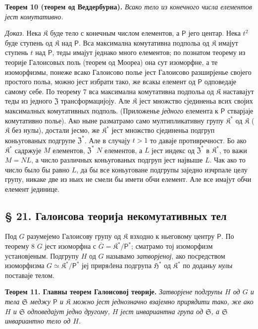 \documentclass[11pt]{article}
\begin{document}
\textbf{Теорем 10 (теорем од Веддербурна).} \emph{Всако тело из конечного числа елементов јест комутативно.}

\emph{Доказ.} Нека \(\mathfrak K\) буде тело с конечным числом елементов, а \(\mathsf P\) јего центар. Нека \(t^2\) буде ступень од \(\mathfrak K\) над \(\mathsf P\). Вса максимална комутативна подпольа од \(\mathfrak K\) имајут ступень \(t\) над \(\mathsf P\), теды имајут једнако много елементов; по познатом теорему из теорије Галоисовых поль (теорем од Моореа) она сут изоморфне, а те изоморфизмы, понеже всако Галоисово полье јест Галоисово разширјенье својего простого польа, можно јест избрати тако, же всакы елемент од \(\mathsf P\) одповедаје самому себе. По теорему 7 вса максимална комутативна подпольа од \(\mathfrak K\) наставајут теды из једного \(\mathfrak Z\) трансформацијоју. Але \(\mathfrak K\) јест множство сјединеньа всих својих максималных комутативных подполь. (Приложенье \emph{једного} елемента к \(\mathsf P\) стварјаје комутативно полье). Ако ныне разматрамо само мултипликативну групу \(\mathfrak K^*\) од \(\mathfrak K\) (\(\mathfrak K\) без нулы), достали јесмо, же \(\mathfrak K^*\) јест множство сјединеньа подгруп коньугованых подгрупе \(\mathfrak Z^*\). Але в случају \(t>1\) то даваје противречност. Бо ако \(\mathfrak K^*\) садржује \(M\) елементов, \(\mathfrak Z^*\) \(N\) елементов, а \(L\) јест индекс од \(\mathfrak Z^*\) в \(\mathfrak K^*\), то важи \(M=NL\), а число различных коньугованых подгруп јест највыше \(L\). Чак ако то число было бы равно \(L\), да бы все коньуговане подгрупы заједно изчрпале целу групу, никаке две из ньих не смели бы имети обчи елемент. Але все имајут обчи елемент јединице.

\subsection*{§ 21. Галоисова теорија некомутативных тел}\label{die-galoissche-theorie-der-nichtkommutativen-koerper}

Под \(G\) разумејемо Галоисову групу од \(\mathfrak K\) взходно к ньеговому центру \(\mathsf P\). По теорему 8 \(G\) јест изоморфна с \(\overline G=\mathfrak K^*/\mathsf P^*\); сматрамо тој изоморфизм установјеным. Подгрупу \(H\) од \(G\) называмо \emph{затворјеној}, ако посредством изоморфизма \(G\simeq\mathfrak K^*/\mathsf P^*\) јеј приряđена подгрупа \(\mathfrak H^*\) од \(\mathfrak K^*\) по доданьу \emph{нулы} поставаје телом.


\textbf{Теорем 11. Главны теорем Галоисовој теорије.} \emph{Затворјене подгрупы \(H\) од \(G\) и тела \(\mathfrak S\) меджу \(\mathsf P\) и \(\mathfrak K\) можно јест једнозначно взајемно прирядити тако, же ако \(H\) и \(\mathfrak S\) одповедајут једно другому, \(H\) јест инвариантна група од \(\mathfrak S\), а \(\mathfrak S\) инвариантно тело од \(H\).}
\end{document}
